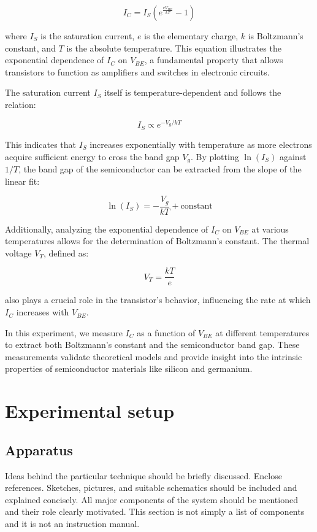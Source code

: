 \documentclass[12pt,letterpaper,twocolumn]{article}
\begin{document}
\[
I_C = I_S \left(e^{\frac{eV_{BE}}{kT}} - 1\right)
\]

where \( I_S \) is the saturation current, \( e \) is the elementary charge, \( k \) is Boltzmann’s constant, and \( T \) is the absolute temperature. This equation illustrates the exponential dependence of \( I_C \) on \( V_{BE} \), a fundamental property that allows transistors to function as amplifiers and switches in electronic circuits\cite{Neudeck}.

The saturation current \( I_S \) itself is temperature-dependent and follows the relation:

\[
I_S \propto e^{-V_g/kT}
\]

This indicates that \( I_S \) increases exponentially with temperature as more electrons acquire sufficient energy to cross the band gap \( V_g \). By plotting \( \ln(I_S) \) against \( 1/T \), the band gap of the semiconductor can be extracted from the slope of the linear fit:

\[
\ln(I_S) = -\frac{V_g}{kT} + \text{constant}
\]

Additionally, analyzing the exponential dependence of \( I_C \) on \( V_{BE} \) at various temperatures allows for the determination of Boltzmann’s constant. The thermal voltage \( V_T \), defined as:

\[
V_T = \frac{kT}{e}
\]

also plays a crucial role in the transistor’s behavior, influencing the rate at which \( I_C \) increases with \( V_{BE} \)\cite{Collings1980}.

In this experiment, we measure \( I_C \) as a function of \( V_{BE} \) at different temperatures to extract both Boltzmann’s constant and the semiconductor band gap. These measurements validate theoretical models and provide insight into the intrinsic properties of semiconductor materials like silicon and germanium.



\section{Experimental setup}


\subsection{Apparatus}

Ideas behind the particular technique should be briefly
discussed. Enclose references. Sketches, pictures, and
suitable schematics should be included and explained
concisely. All major components of the system should be
mentioned and their role clearly motivated. This section
is not simply a list of components and it is not an
instruction manual. 
\end{document}
